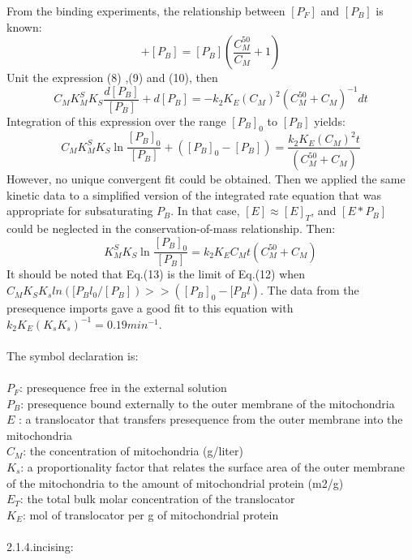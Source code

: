 \documentclass[a4paper,10pt]{article}
\begin{document}
From the binding experiments, the relationship between $[P_F]$ and $[P_B]$ is known:
\begin{equation}
[P_F]+[P_B]=[P_B](\frac{C_M^{50}}{C_M}+1)
\end{equation}
Unit the expression (8) ,(9) and (10), then
\begin{equation}
C_MK_M^SK_S \frac{d[P_B]}{[P_B]}+d[P_B]=-k_2K_E(C_M)^2(C_M^{50}+C_M)^{-1} d t
\end{equation}
Integration of this expression over the range $[P_B]_0$ to $[P_B]$ yields:
\begin{equation}
C_MK_M^SK_S\ln\frac{[P_B]_0}{[P_B]}+([P_B]_0-[P_B])=\frac{k_2K_E(C_M)^2 t}{(C_M^{50}+C_M)}
\end{equation}
However, no unique convergent fit could be obtained. Then we applied the same kinetic data to a simplified version of the integrated rate equation that was appropriate for subsaturating $P_B$. In that case,  $[E] \approx [E]_T$, and $[E*P_B]$ could be neglected in the conservation-of-mass relationship. Then:
\begin{equation}
K_M^SK_S\ln\frac{[P_B]_0}{[P_B]}=k_2K_EC_Mt(C_M^{50}+C_M)
\end{equation}
It should be noted that Eq.(13) is the limit of Eq.(12) when $C_MK_S K_sln([P_Bl_0/[P_B]) >> ([P_B]_0 - [P_Bl)$. The data from the presequence imports gave a good fit to this equation with $k_2K_E(K_s K_s)^{-1} = 0.19 min^{-1}$.
	\\\\
	The symbol declaration is:\\\\
	$P_F$: presequence free in the external  solution\\
	$P_B$: presequence bound externally to the outer membrane of the mitochondria\\
	$E$ : a translocator that transfers presequence from the outer membrane into the mitochondria\\
	$C_M$: the concentration of mitochondria (g/liter)\\
	$K_s$: a proportionality factor that relates the surface area of the outer membrane of the mitochondria to the amount of mitochondrial protein (m2/g) \\
	$E_T$: the total bulk molar concentration of the translocator\\
	$K_E$: mol of translocator per g of mitochondrial protein
	\\\\ 
	2.1.4.incising:\\
\end{document}
